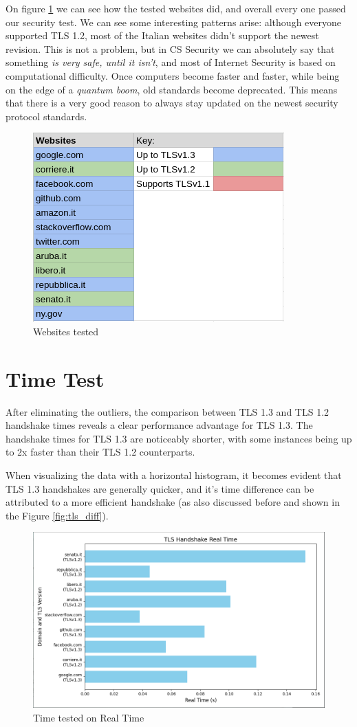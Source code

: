 \documentclass{article}
\begin{document}
On figure \ref{fig:websites} we can see how the tested websites did, and overall every one passed our security test. We can see some interesting patterns arise: although everyone supported TLS 1.2, most of
the Italian websites didn't support the newest revision.
This is not a problem, but in CS Security we can absolutely say that something \textit{is very safe, until it isn't}, and most of Internet Security is based on computational difficulty. Once computers become faster and faster, while being on the edge of a \textit{quantum boom}, old standards become deprecated. This means that there is a very good reason to always stay updated on the newest security protocol standards.


\begin{figure}
    \centering
    \includegraphics[width=0.6\linewidth]{websites.png}
    \caption{Websites tested}
    \label{fig:websites}
\end{figure}

\section*{Time Test}
After eliminating the outliers, the comparison between TLS 1.3 and TLS 1.2 handshake times reveals a clear performance advantage for TLS 1.3. The handshake times for TLS 1.3 are noticeably shorter, with some instances being up to 2x faster than their TLS 1.2 counterparts.

When visualizing the data with a horizontal histogram, it becomes evident that TLS 1.3 handshakes are generally quicker, and it's time difference can be attributed to a more efficient handshake (as also discussed before and shown in the Figure \ref{fig:tls_diff}).
\begin{figure}
    \centering
    \includegraphics[width=0.8\linewidth]{time.png}
    \caption{Time tested on Real Time}
    \label{fig:time}
\end{figure}
\end{document}
